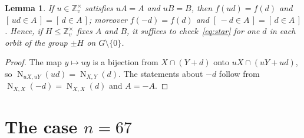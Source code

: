 \documentclass[11pt]{amsart}
\newtheorem{lemma}[theorem]{Lemma}
\theoremstyle{definition}
\theoremstyle{remark}
\numberwithin{equation}{section}
\newcommand{\Z}{\mathbb{Z}}
\newcommand{\NN}{\operatorname{N}}
\newcommand{\ind}[1]{[\,#1\,]}
\begin{document}
\begin{lemma}\label{lem:mult}
If $u\in\Z_v^\times$ satisfies $uA=A$ and $uB=B$, then $f(ud)=f(d)$ and $\ind{ud\in A}=\ind{d\in A}$; moreover $f(-d)=f(d)$ and $\ind{-d\in A}=\ind{d\in A}$. Hence, if $H\le\Z_v^\times$ fixes $A$ and $B$, it suffices to check~\eqref{eq:star} for one $d$ in each orbit of the group $\pm H$ on $G\setminus\{0\}$.
\end{lemma}

\begin{proof}
The map $y\mapsto uy$ is a bijection from $X\cap(Y+d)$ onto $uX\cap(uY+ud)$, so $\NN_{uX,uY}(ud)=\NN_{X,Y}(d)$. The statements about $-d$ follow from $\NN_{X,X}(-d)=\NN_{X,X}(d)$ and $A=-A$.
\end{proof}

\section{The case \texorpdfstring{$n=67$}{n = 67}}\label{sec:67}
\end{document}
